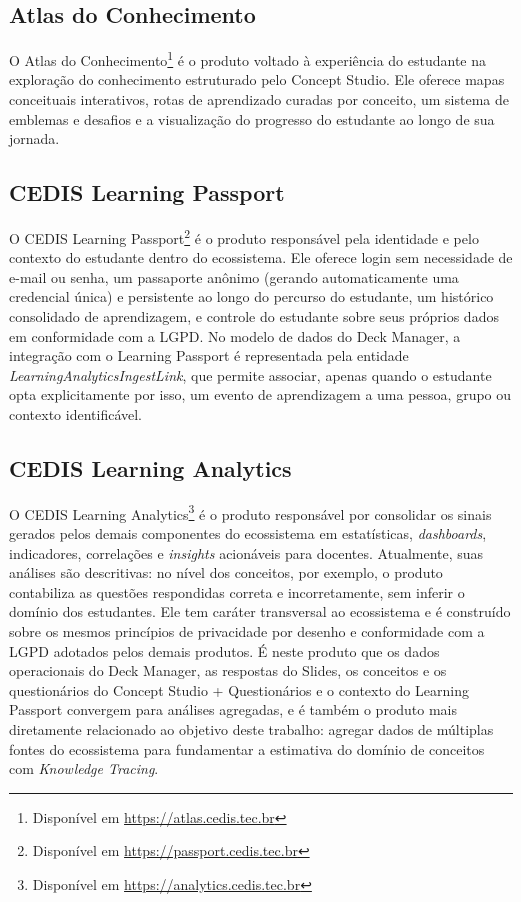 \subsection{Atlas do Conhecimento}
\label{subsec:atlas}

O Atlas do Conhecimento\footnote{Disponível em \url{https://atlas.cedis.tec.br}} é o produto
voltado à experiência do estudante na exploração do conhecimento estruturado
pelo Concept Studio. Ele oferece mapas conceituais interativos, rotas de
aprendizado curadas por conceito, um sistema de emblemas e desafios e a visualização do
progresso do estudante ao longo de sua jornada.

\subsection{CEDIS Learning Passport}
\label{subsec:learning-passport}

O CEDIS Learning Passport\footnote{Disponível em \url{https://passport.cedis.tec.br}} é o
produto responsável pela identidade e pelo contexto do estudante dentro do
ecossistema. Ele oferece login sem necessidade de e-mail ou senha, um
passaporte anônimo (gerando automaticamente uma credencial única) e persistente
ao longo do percurso do estudante, um histórico consolidado de aprendizagem, e controle do estudante sobre
seus próprios dados em conformidade com a LGPD. No modelo de dados
do Deck Manager, a integração com o Learning Passport é representada pela
entidade \textit{LearningAnalyticsIngestLink}, que permite associar,
apenas quando o estudante opta explicitamente por isso, um evento de
aprendizagem a uma pessoa, grupo ou contexto identificável.

\subsection{CEDIS Learning Analytics}
\label{subsec:learning-analytics}

O CEDIS Learning Analytics\footnote{Disponível em \url{https://analytics.cedis.tec.br}} é o
produto responsável por consolidar os sinais gerados pelos demais
componentes do ecossistema em estatísticas, \textit{dashboards},
indicadores, correlações e \textit{insights} acionáveis para docentes.
Atualmente, suas análises são descritivas: no nível dos conceitos, por
exemplo, o produto contabiliza as questões respondidas correta e
incorretamente, sem inferir o domínio dos estudantes.
Ele tem caráter transversal ao ecossistema e é construído sobre os mesmos
princípios de privacidade por desenho e conformidade com a LGPD adotados
pelos demais produtos. É neste produto que os dados operacionais do Deck
Manager, as respostas do Slides, os conceitos e os questionários do Concept
Studio + Questionários e o contexto do Learning Passport convergem para
análises agregadas, e é também o produto mais diretamente relacionado ao
objetivo deste trabalho: agregar dados de múltiplas fontes do ecossistema
para fundamentar a estimativa do domínio de conceitos com \textit{Knowledge
Tracing}.

